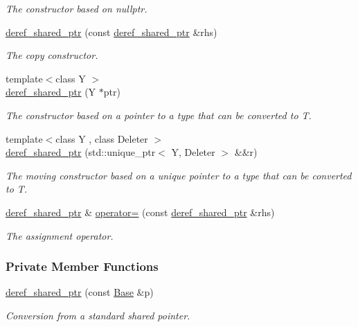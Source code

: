 \begin{DoxyCompactItemize}
\begin{DoxyCompactList}\small\item\em The constructor based on {\ttfamily nullptr}. \end{DoxyCompactList}\item 
\hyperlink{classslb_1_1core_1_1util_1_1deref__shared__ptr_abeeb35b697324718b90d6e7b32561f6f}{deref\+\_\+shared\+\_\+ptr} (const \hyperlink{classslb_1_1core_1_1util_1_1deref__shared__ptr}{deref\+\_\+shared\+\_\+ptr} \&rhs)
\begin{DoxyCompactList}\small\item\em The copy constructor. \end{DoxyCompactList}\item 
{\footnotesize template$<$class Y $>$ }\\\hyperlink{classslb_1_1core_1_1util_1_1deref__shared__ptr_a61799e773215340c1f2f6a763d6ed308}{deref\+\_\+shared\+\_\+ptr} (Y $\ast$ptr)
\begin{DoxyCompactList}\small\item\em The constructor based on a pointer to a type that can be converted to {\ttfamily T}. \end{DoxyCompactList}\item 
{\footnotesize template$<$class Y , class Deleter $>$ }\\\hyperlink{classslb_1_1core_1_1util_1_1deref__shared__ptr_aaf5ef266fc89518c148b28e7260a869f}{deref\+\_\+shared\+\_\+ptr} (std\+::unique\+\_\+ptr$<$ Y, Deleter $>$ \&\&r)
\begin{DoxyCompactList}\small\item\em The moving constructor based on a unique pointer to a type that can be converted to {\ttfamily T}. \end{DoxyCompactList}\item 
\hyperlink{classslb_1_1core_1_1util_1_1deref__shared__ptr}{deref\+\_\+shared\+\_\+ptr} \& \hyperlink{classslb_1_1core_1_1util_1_1deref__shared__ptr_aec141838789d45a5d1d1bdf83a60d9cf}{operator=} (const \hyperlink{classslb_1_1core_1_1util_1_1deref__shared__ptr}{deref\+\_\+shared\+\_\+ptr} \&rhs)
\begin{DoxyCompactList}\small\item\em The assignment operator. \end{DoxyCompactList}\end{DoxyCompactItemize}
\subsubsection*{Private Member Functions}
\begin{DoxyCompactItemize}
\item 
\hyperlink{classslb_1_1core_1_1util_1_1deref__shared__ptr_aff37dd35fa8437c3ca360861fc9a0779}{deref\+\_\+shared\+\_\+ptr} (const \hyperlink{classslb_1_1core_1_1util_1_1deref__shared__ptr_a288bb6317a3a5b58f0d1af011ec323f0}{Base} \&p)
\begin{DoxyCompactList}\small\item\em Conversion from a standard shared pointer. \end{DoxyCompactList}\end{DoxyCompactItemize}
